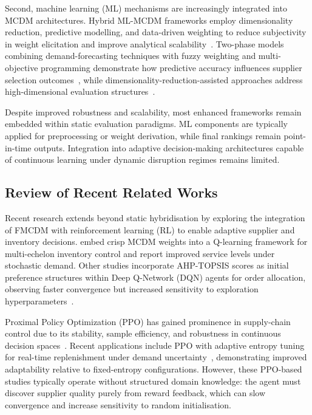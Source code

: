 \documentclass[preprint,12pt]{elsarticle}
\begin{document}
Second, machine learning (ML) mechanisms are increasingly integrated into MCDM architectures.
Hybrid ML-MCDM frameworks employ dimensionality reduction, predictive modelling, and data-driven weighting to reduce subjectivity in weight elicitation and improve analytical scalability~\citep{Recent_ML_MCDM_hybrid_2024}.
Two-phase models combining demand-forecasting techniques with fuzzy weighting and multi-objective programming demonstrate how predictive accuracy influences supplier selection outcomes~\citep{Recent_forecast_MCDM_2025}, while dimensionality-reduction-assisted approaches address high-dimensional evaluation structures~\citep{Recent_dimreduction_MCDM_2025}.

Despite improved robustness and scalability, most enhanced frameworks remain embedded within static evaluation paradigms.
ML components are typically applied for preprocessing or weight derivation, while final rankings remain point-in-time outputs.
Integration into adaptive decision-making architectures capable of continuous learning under dynamic disruption regimes remains limited.

\subsection{Review of Recent Related Works}
Recent research extends beyond static hybridisation by exploring the integration of FMCDM with reinforcement learning (RL) to enable adaptive supplier and inventory decisions. \citet{Wang_etal_2022} embed crisp MCDM weights into a Q-learning framework for multi-echelon inventory control and report improved service levels under stochastic demand. Other studies incorporate AHP-TOPSIS scores as initial preference structures within Deep Q-Network (DQN) agents for order allocation, observing faster convergence but increased sensitivity to exploration hyperparameters~\citep{Recent_MCDM_DQN_2024}.

Proximal Policy Optimization (PPO) has gained prominence in supply-chain control due to its stability, sample efficiency, and robustness in continuous decision spaces~\citep{Schulman_etal_2017}. Recent applications include PPO with adaptive entropy tuning for real-time replenishment under demand uncertainty~\citep{Li_etal_2024}, demonstrating improved adaptability relative to fixed-entropy configurations. However, these PPO-based studies typically operate without structured domain knowledge: the agent must discover supplier quality purely from reward feedback, which can slow convergence and increase sensitivity to random initialisation.
\end{document}
